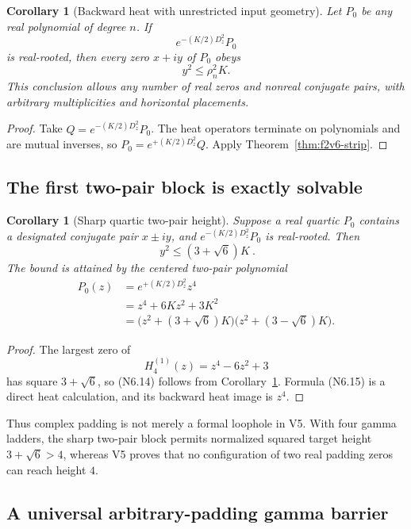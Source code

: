 \documentclass[11pt]{article}
\newtheorem{corollary}[theorem]{Corollary}
\theoremstyle{definition}
\theoremstyle{remark}
\begin{document}
\begin{corollary}[Backward heat with unrestricted input geometry]
\label{cor:f2v6-backward}
Let \(P_0\) be any real polynomial of degree \(n\).  If
\[
 e^{-(K/2)D_z^2}P_0
 \tag{N6.12}
\]
is real-rooted, then every zero \(x+iy\) of \(P_0\) obeys
\[
 y^2\le\rho_n^2K.
 \tag{N6.13}
\]
This conclusion allows any number of real zeros and nonreal conjugate
pairs, with arbitrary multiplicities and horizontal placements.
\end{corollary}

\begin{proof}
Take \(Q=e^{-(K/2)D_z^2}P_0\).  The heat operators terminate on
polynomials and are mutual inverses, so
\(P_0=e^{+(K/2)D_z^2}Q\).  Apply Theorem~\ref{thm:f2v6-strip}.
\end{proof}

\subsection{The first two-pair block is exactly solvable}

\begin{corollary}[Sharp quartic two-pair height]
\label{cor:f2v6-quartic}
Suppose a real quartic \(P_0\) contains a designated conjugate pair
\(x\pm iy\), and \(e^{-(K/2)D_z^2}P_0\) is real-rooted.  Then
\[
 \boxed{\ y^2\le(3+\sqrt6)K\ }.
 \tag{N6.14}
\]
The bound is attained by the centered two-pair polynomial
\[
\begin{aligned}
 P_0(z)
 &=e^{+(K/2)D_z^2}z^4\\
 &=z^4+6Kz^2+3K^2\\
 &=\bigl(z^2+(3+\sqrt6)K\bigr)
   \bigl(z^2+(3-\sqrt6)K\bigr).
\end{aligned}
\tag{N6.15}
\]
\end{corollary}

\begin{proof}
The largest zero of
\[
 H_4^{(1)}(z)=z^4-6z^2+3
 \tag{N6.16}
\]
has square \(3+\sqrt6\), so \textup{(N6.14)} follows from
Corollary~\ref{cor:f2v6-backward}.  Formula \textup{(N6.15)} is a direct
heat calculation, and its backward heat image is \(z^4\).
\end{proof}

Thus complex padding is not merely a formal loophole in V5.  With four
gamma ladders, the sharp two-pair block permits normalized squared target
height \(3+\sqrt6>4\), whereas V5 proves that no configuration of two real
padding zeros can reach height \(4\).

\subsection{A universal arbitrary-padding gamma barrier}
\end{document}
